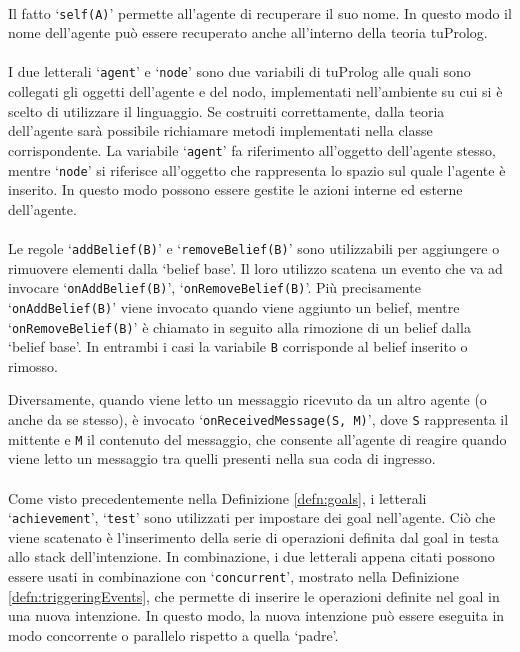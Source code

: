 \paragraph*{}
Il fatto `\texttt{self(A)}' permette all'agente di recuperare il suo nome. In questo modo il nome dell'agente può essere recuperato anche all'interno della teoria tuProlog.

\paragraph*{}
I due letterali `\texttt{agent}' e `\texttt{node}' sono due variabili di tuProlog alle quali sono collegati gli oggetti dell'agente e del nodo, implementati nell'ambiente su cui si è scelto di utilizzare il linguaggio. Se costruiti correttamente, dalla teoria dell'agente sarà possibile richiamare metodi implementati nella classe corrispondente. La variabile `\texttt{agent}' fa riferimento all'oggetto dell'agente stesso, mentre `\texttt{node}' si riferisce all'oggetto che rappresenta lo spazio sul quale l'agente è inserito. In questo modo possono essere gestite le azioni interne ed esterne dell'agente.

\paragraph*{}
Le regole `\texttt{addBelief(B)}' e `\texttt{removeBelief(B)}' sono utilizzabili per aggiungere o rimuovere elementi dalla `belief base'. Il loro utilizzo scatena un evento che va ad invocare `\texttt{onAddBelief(B)}', `\texttt{onRemoveBelief(B)}'. Più precisamente `\texttt{onAddBelief(B)}' viene invocato quando viene aggiunto un belief, mentre `\texttt{onRe\-moveBe\-lief(B)}' è chiamato in seguito alla rimozione di un belief dalla `belief base'. In entrambi i casi la variabile \texttt{B} corrisponde al belief inserito o rimosso.

Diversamente, quando viene letto un messaggio ricevuto da un altro agente (o anche da se stesso), è invocato `\texttt{onReceivedMessage(S, M)}', dove \texttt{S} rappresenta il mittente e \texttt{M} il contenuto del messaggio, che consente all'agente di reagire quando viene letto un messaggio tra quelli presenti nella sua coda di ingresso.

\paragraph*{}
Come visto precedentemente nella Definizione \ref{defn:goals}, i letterali `\texttt{achievement}', `\texttt{test}' sono utilizzati per impostare dei goal nell'agente. Ciò che viene scatenato è l'inserimento della serie di operazioni definita dal goal in testa allo stack dell'intenzione.
In combinazione, i due letterali appena citati possono essere usati in combinazione con `\texttt{concurrent}', mostrato nella Definizione \ref{defn:triggeringEvents}, che permette di inserire le operazioni definite nel goal in una nuova intenzione. In questo modo, la nuova intenzione può essere eseguita in modo concorrente o parallelo rispetto a quella `padre'.

